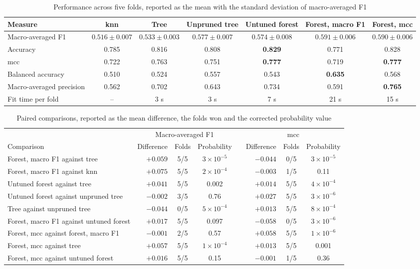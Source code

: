 \documentclass[conference]{IEEEtran}
\begin{document}
\begin{table}[t]
\centering
\caption{Performance across five folds, reported as the mean with the standard deviation of macro-averaged F1}
\label{tab:main}
\small
\begin{tabular}{lcccccc}
\toprule
Measure & \acrshort{knn} & Tree & Unpruned tree & Untuned forest & Forest, macro F1 & Forest, \acrshort{mcc} \\
\midrule
Macro-averaged F1 & $0.516 \pm 0.007$ & $0.533 \pm 0.003$ & $0.577 \pm 0.007$ & $0.574 \pm 0.008$ & $\mathbf{0.591 \pm 0.006}$ & $0.590 \pm 0.006$ \\
Accuracy & 0.785 & 0.816 & 0.808 & \textbf{0.829} & 0.771 & 0.828 \\
\acrshort{mcc} & 0.722 & 0.763 & 0.751 & \textbf{0.777} & 0.719 & \textbf{0.777} \\
Balanced accuracy & 0.510 & 0.524 & 0.557 & 0.543 & \textbf{0.635} & 0.568 \\
Macro-averaged precision & 0.562 & 0.702 & 0.643 & 0.734 & 0.591 & \textbf{0.765} \\
Fit time per fold & -- & 3 s & 3 s & 7 s & 21 s & 15 s \\
\bottomrule
\end{tabular}
\end{table}

\begin{table}[t]
\centering
\caption{Paired comparisons, reported as the mean difference, the folds won and the corrected probability value}
\label{tab:comparisons}
\small
\begin{tabular}{lrcclrcc}
\toprule
& \multicolumn{3}{c}{Macro-averaged F1} & & \multicolumn{3}{c}{\acrshort{mcc}} \\
\cmidrule{2-4}\cmidrule{6-8}
Comparison & Difference & Folds & Probability & & Difference & Folds & Probability \\
\midrule
Forest, macro F1 against tree & $+0.059$ & 5/5 & $3\times10^{-5}$ & & $-0.044$ & 0/5 & $3\times10^{-5}$ \\
Forest, macro F1 against \acrshort{knn} & $+0.075$ & 5/5 & $2\times10^{-4}$ & & $-0.003$ & 1/5 & 0.11 \\
Untuned forest against tree & $+0.041$ & 5/5 & 0.002 & & $+0.014$ & 5/5 & $4\times10^{-4}$ \\
Untuned forest against unpruned tree & $-0.002$ & 3/5 & 0.76 & & $+0.027$ & 5/5 & $3\times10^{-6}$ \\
Tree against unpruned tree & $-0.044$ & 0/5 & $5\times10^{-4}$ & & $+0.013$ & 5/5 & $8\times10^{-4}$ \\
Forest, macro F1 against untuned forest & $+0.017$ & 5/5 & 0.097 & & $-0.058$ & 0/5 & $3\times10^{-6}$ \\
Forest, \acrshort{mcc} against forest, macro F1 & $-0.001$ & 2/5 & 0.57 & & $+0.058$ & 5/5 & $1\times10^{-6}$ \\
Forest, \acrshort{mcc} against tree & $+0.057$ & 5/5 & $1\times10^{-4}$ & & $+0.013$ & 5/5 & 0.001 \\
Forest, \acrshort{mcc} against untuned forest & $+0.016$ & 5/5 & 0.15 & & $-0.001$ & 1/5 & 0.36 \\
\bottomrule
\end{tabular}
\end{table}
\end{document}
